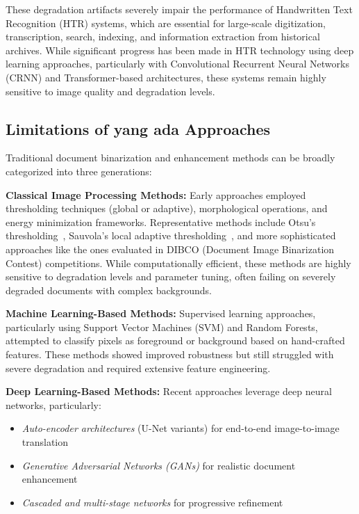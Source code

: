 \documentclass[journal]{IEEEtran}
\begin{document}
These degradation artifacts severely impair the performance of Handwritten Text Recognition (HTR) systems, which are essential for large-scale digitization, transcription, search, indexing, and information extraction from historical archives. While significant progress has been made in HTR technology using deep learning approaches, particularly with Convolutional Recurrent Neural Networks (CRNN) and Transformer-based architectures, these systems remain highly sensitive to image quality and degradation levels.

\subsection{Limitations of yang ada Approaches}

Traditional document binarization and enhancement methods can be broadly categorized into three generations:

\textbf{Classical Image Processing Methods:} Early approaches employed thresholding techniques (global or adaptive), morphological operations, and energy minimization frameworks. Representative methods include Otsu's thresholding~\cite{otsu1979threshold}, Sauvola's local adaptive thresholding~\cite{sauvola2000adaptive}, and more sophisticated approaches like the ones evaluated in DIBCO (Document Image Binarization Contest) competitions. While computationally efficient, these methods are highly sensitive to degradation levels and parameter tuning, often failing on severely degraded documents with complex backgrounds.

\textbf{Machine Learning-Based Methods:} Supervised learning approaches, particularly using Support Vector Machines (SVM) and Random Forests, attempted to classify pixels as foreground or background based on hand-crafted features. These methods showed improved robustness but still struggled with severe degradation and required extensive feature engineering.

\textbf{Deep Learning-Based Methods:} Recent approaches leverage deep neural networks, particularly:
\begin{itemize}
    \item \textit{Auto-encoder architectures} (U-Net variants) for end-to-end image-to-image translation~\cite{tensmeyer2017document,calvo2018selectional}
    \item \textit{Generative Adversarial Networks (GANs)} for realistic document enhancement~\cite{souibgui2020degan,zhao2019document}
    \item \textit{Cascaded and multi-stage networks} for progressive refinement~\cite{vo2018binarization}
\end{itemize}
\end{document}
